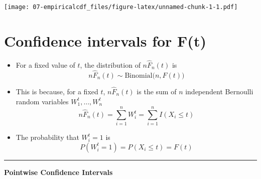\documentclass[]{book}
\begin{document}
\texttt{[image: 07-empiricalcdf\_files/figure-latex/unnamed-chunk-1-1.pdf]}

\hypertarget{confidence-intervals-for-ft}{%
\section{Confidence intervals for F(t)}\label{confidence-intervals-for-ft}}

\begin{itemize}
\item
  For a fixed value of \(t\), the distribution of \(n\hat{F}_{n}(t)\) is
  \begin{equation}
  n \hat{F}_{n}(t) \sim \textrm{Binomial}\big( n, F(t) \big)
  \end{equation}
\item
  This is because, for a fixed \(t\), \(n\hat{F}_{n}(t)\) is the sum of \(n\) independent
  Bernoulli random variables \(W_{1}^{t}, \ldots, W_{n}^{t}\)
  \begin{equation}
  n \hat{F}_{n}(t) = \sum_{i=1}^{n} W_{i}^{t} = \sum_{i=1}^{n} I( X_{i} \leq t)
  \end{equation}
\item
  The probability that \(W_{i}^{t} = 1\) is
  \begin{equation}
  P( W_{i}^{t} = 1) = P(X_{i} \leq t) = F(t) \nonumber
  \end{equation}
\end{itemize}

\begin{center}\rule{0.5\linewidth}{\linethickness}\end{center}

\textbf{Pointwise Confidence Intervals}
\end{document}
